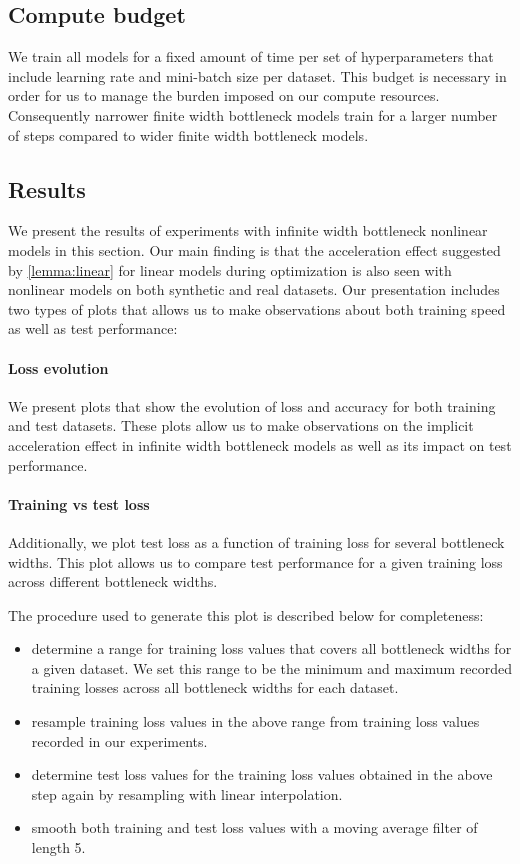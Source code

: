 \documentclass{article}
\theoremstyle{definition}
\theoremstyle{remark}
\renewcommand{\[}{\begin{eqnarray}}
\renewcommand{\]}{\end{eqnarray}}
\renewcommand{\[}{\begin{eqnarray}}
\renewcommand{\]}{\end{eqnarray}}
\begin{document}
\subsection{Compute budget}
We train all models for a fixed amount of time per set of hyperparameters that include learning rate and mini-batch size per dataset. This budget is necessary in order for us to manage the burden imposed on our compute resources. Consequently narrower finite width bottleneck models train for a larger number of steps compared to wider finite width bottleneck models.

\subsection{Results}
\label{appendix:expt:results}
We present the results of experiments with infinite width bottleneck nonlinear models in this section. Our main finding is that the acceleration effect suggested by \cref{lemma:linear} for linear models during optimization is also seen with nonlinear models on both synthetic and real datasets. Our presentation includes two types of plots that allows us to make observations about both training speed as well as test performance:
\paragraph{Loss evolution} We present plots that show the evolution of loss and accuracy for both training and test datasets. These plots allow us to make observations on the implicit acceleration effect in infinite width bottleneck models as well as its impact on test performance.

\paragraph{Training vs test loss} \label{appendix:expt:results:tvt} Additionally, we plot test loss as a function of training loss for several bottleneck widths. This plot allows us to compare test performance for a given training loss across different bottleneck widths. 

The procedure used to generate this plot is described below for completeness:
\begin{itemize}
    \item determine a range for training loss values that covers all bottleneck widths for a given dataset. We set this range to be the minimum and maximum recorded training losses across all bottleneck widths for each dataset.
    \item resample training loss values in the above range from training loss values recorded in our experiments.
    \item determine test loss values for the training loss values obtained in the above step again by resampling with linear interpolation.
    \item smooth both training and test loss values with a moving average filter of length 5.
\end{itemize}
\end{document}

